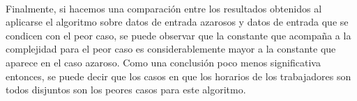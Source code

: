 \paragraph{}
Finalmente, si hacemos una comparación entre los resultados obtenidos al aplicarse el algoritmo sobre datos de entrada azarosos y datos de entrada que se condicen con el peor caso, se puede observar que la constante que acompaña a la complejidad para el peor caso es considerablemente mayor a la constante que aparece en el caso azaroso. Como una conclusión poco menos significativa entonces, se puede decir que los casos en que los horarios de los trabajadores son todos disjuntos son los peores casos para este algoritmo.

